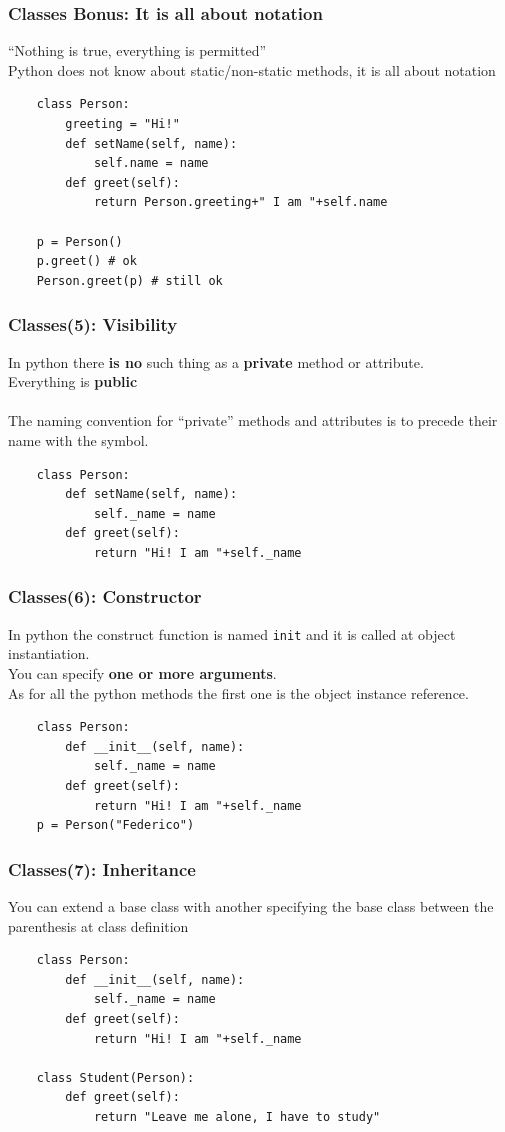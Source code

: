 \documentclass{beamer}
\newcommand{\pyfuncname}[2]{\texttt{\textunderscore\textunderscore#1\textunderscore\textunderscore#2}}
\begin{document}
\begin{frame}[fragile]
    \frametitle{Classes Bonus: It is all about notation}
    ``Nothing is true, everything is permitted''\\
    Python does not know about static/non-static methods, it is all about notation
    \begin{verbatim}
    class Person:
        greeting = "Hi!"
        def setName(self, name):
            self.name = name
        def greet(self):
            return Person.greeting+" I am "+self.name
    
    p = Person()
    p.greet() # ok
    Person.greet(p) # still ok
    \end{verbatim}
\end{frame}



\begin{frame}[fragile]
    \frametitle{Classes(5): Visibility}
    In python there \textbf{is no} such thing as a \textbf{private} method or attribute.\\
    Everything is \textbf{public}\\
    \hfill \\
    The naming convention for ``private'' methods and attributes is to precede their name with the \texttt{\textunderscore} symbol.
    \begin{verbatim}
    class Person:
        def setName(self, name):
            self._name = name
        def greet(self):
            return "Hi! I am "+self._name
    \end{verbatim}
\end{frame}


\begin{frame}[fragile]
    \frametitle{Classes(6): Constructor}
    In python the construct function is named \pyfuncname{init}{} and it is called at object instantiation.\\
    You can specify \textbf{one or more arguments}.\\
    As for all the python methods the first one is the object instance reference.\\
    \begin{verbatim}
    class Person:
        def __init__(self, name):
            self._name = name
        def greet(self):
            return "Hi! I am "+self._name
    p = Person("Federico")
    \end{verbatim}
\end{frame}

\begin{frame}[fragile]
    \frametitle{Classes(7): Inheritance}
    You can extend a base class with another specifying the base class between the parenthesis at class definition
    \begin{verbatim}
    class Person:
        def __init__(self, name):
            self._name = name
        def greet(self):
            return "Hi! I am "+self._name
    
    class Student(Person):
        def greet(self):
            return "Leave me alone, I have to study"
    \end{verbatim}
\end{frame}
\end{document}
